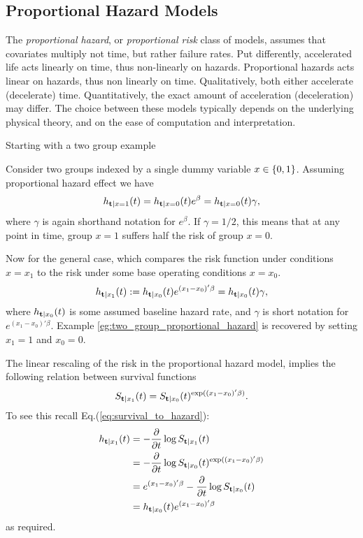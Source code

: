\subsection{Proportional Hazard Models}
The \emph{proportional hazard}, or \emph{proportional risk} class of models, assumes that covariates multiply not time, but rather failure rates. 
Put differently, accelerated life acts linearly on time, thus non-linearly on hazards. Proportional hazards acts linear on hazards, thus non linearly on time. 
Qualitatively, both either accelerate (decelerate) time. 
Quantitatively, the exact amount of acceleration (deceleration) may differ. 
The choice between these models typically depends on the underlying physical theory, and on the ease of computation and interpretation.

Starting with a two group example
\begin{example}
\label{eg:two_group_proportional_hazard}
Consider two groups indexed by a single dummy variable $x \in \{ 0,1 \}$.
Assuming proportional hazard effect we have
$$
	h_{\mathbf{t}|x=1} (t)=h_{\mathbf{t}|x=0} (t) e^\beta=h_{\mathbf{t}|x=0} (t) \gamma, 
$$
where $\gamma$ is again shorthand notation for $e^\beta$.
If $\gamma=1/2$, this means that at any point in time, group $x=1$ suffers half the risk of group $x=0$.
\end{example}


Now for the general case, which compares the risk function under conditions $x=x_1$ to the risk under some base operating conditions $x=x_0$.
\begin{align}
\label{eq:proportional_hazard}
	h_{\mathbf{t}|x_1} (t):=h_{\mathbf{t}|x_0} (t) e^{(x_1-x_0)'\beta} = h_{\mathbf{t}|x_0} (t) \gamma ,
\end{align}
where $h_{\mathbf{t}|x_0} (t)$ is some assumed baseline hazard rate, and $\gamma$ is short notation for $e^{(x_1-x_0)'\beta}$.
Example \ref{eg:two_group_proportional_hazard} is recovered by setting $x_1=1$ and $x_0=0$.


The linear rescaling of the risk in the proportional hazard model, implies the following relation between survival functions
\begin{align}
\label{eq:survival_proportional_hazard}
	S_{\mathbf{t}|x_1} (t)=S_{\mathbf{t}|x_0} (t)^{\exp((x_1-x_0)'\beta)}.
\end{align}
To see this recall Eq.(\ref{eq:survival_to_hazard}):
\begin{align*}
h_{\mathbf{t}|x_1} (t) 
&=  - \frac{\partial}{\partial t} \log S_{\mathbf{t}|x_1} (t)  \\
&= - \frac{\partial}{\partial t} \log S_{\mathbf{t}|x_0} (t)^{\exp((x_1-x_0)'\beta)} \\
&= e^{(x_1-x_0)'\beta} - \frac{\partial}{\partial t}  \log S_{\mathbf{t}|x_0} (t) \\
&=  h_{\mathbf{t}|x_0} (t) e^{(x_1-x_0)'\beta} 
\end{align*}
as required.




